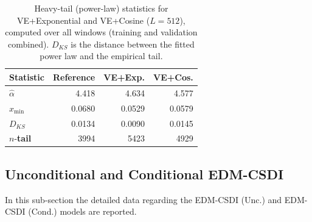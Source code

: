 

\begin{table}[htbp]
\centering
\footnotesize
\renewcommand{\arraystretch}{1.28}
\setlength{\tabcolsep}{3pt}
\begin{tabular}{
  l
  r r r          %
}
\toprule
\textbf{Statistic}
  & \textbf{Reference} & \textbf{VE+Exp.} & \textbf{VE+Cos.} \\
\midrule
\(\hat{\alpha}\)
  &  4.418 &  4.634 &  4.577 \\
\(x_{\min}\)
  &  0.0680 &  0.0529 &  0.0579 \\
\(D_{KS}\)
  & 0.0134 & 0.0090 & 0.0145 \\
\(n\)-\textbf{tail}
  & 3994 & 5423 & 4929 \\
\bottomrule
\end{tabular}
\caption{Heavy-tail (power-law) statistics for VE+Exponential and VE+Cosine ($L=512$), computed over all windows (training and validation combined). $D_{KS}$ is the distance between the fitted power law and the empirical tail.}
\label{tab:appendix_stylized_facts_ve_512_100}
\end{table}

\newpage
\subsection{Unconditional and Conditional EDM-CSDI}
In this sub-section the detailed data regarding the EDM-CSDI (Unc.) and EDM-CSDI (Cond.) models are reported.

